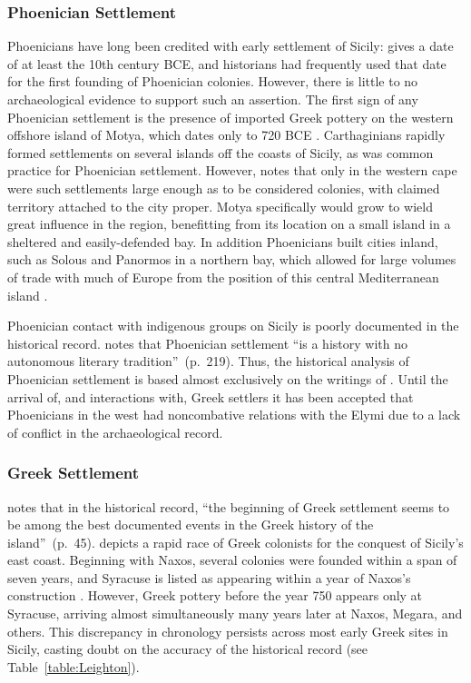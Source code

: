 \documentclass{../../../coursework}
\begin{document}
\subsubsection{Phoenician Settlement}

Phoenicians have long been credited with early settlement of Sicily:
\citeauthor{Thucydides} gives a date of at least the 10th century BCE, and
historians had frequently used that date for the first founding of Phoenician
colonies. However, there is little to no archaeological evidence to support
such an assertion. The first sign of any Phoenician settlement is the presence
of imported Greek pottery on the western offshore island of Motya, which dates
only to 720 BCE \parencite{Lei99}. Carthaginians rapidly formed settlements on
several islands off the coasts of Sicily, as was common practice for
Phoenician settlement. However, \textcite{Fre92} notes that only in the
western cape were such settlements large enough as to be considered colonies,
with claimed territory attached to the city proper. Motya specifically would
grow to wield great influence in the region, benefitting from its location on
a small island in a sheltered and easily-defended bay. In addition Phoenicians
built cities inland, such as Solous and Panormos in a northern bay, which
allowed for large volumes of trade with much of Europe from the position of
this central Mediterranean island \parencite{Fre92}.

Phoenician contact with indigenous groups on Sicily is poorly documented in
the historical record. \textcite{Lei99} notes that Phoenician settlement ``is
a history with no autonomous literary tradition''~(p.~219). Thus, the
historical analysis of Phoenician settlement is based almost exclusively on
the writings of \citeauthor{Thucydides}. Until the arrival of, and
interactions with, Greek settlers it has been accepted that Phoenicians in the
west had noncombative relations with the Elymi due to a lack of conflict in
the archaeological record.

\subsubsection{Greek Settlement}

\textcite{Hol91} notes that in the historical record, ``the beginning of Greek
settlement seems to be among the best documented events in the Greek history
of the island''~(p.~45). \citeauthor{Thucydides} depicts a rapid race of Greek
colonists for the conquest of Sicily's east coast. Beginning with Naxos,
several colonies were founded within a span of seven years, and Syracuse is
listed as appearing within a year of Naxos's construction
\parencite[VI.3]{Thucydides}. However, Greek pottery before the year 750
appears only at Syracuse, arriving almost simultaneously many years later at
Naxos, Megara, and others. This discrepancy in chronology persists across most
early Greek sites in Sicily, casting doubt on the accuracy of the historical
record (see Table~\ref{table:Leighton}).
\end{document}
